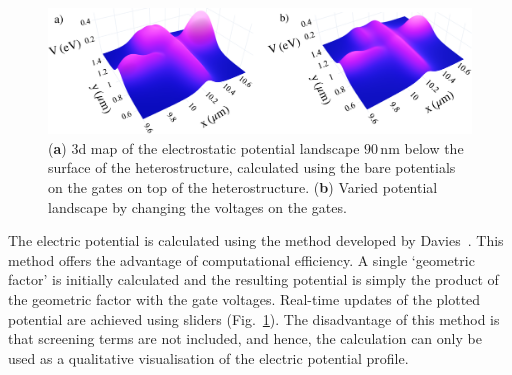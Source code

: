 \begin{figure}[!bht]
 \begin{center}
 \includegraphics[width=1.0\textwidth]{figures/appendix/appendix2_potential.pdf}
 \caption[Electric Potential Calculation]{\label{fig:appx/kwant_pot} 
 (\textbf{a}) 3d map of the electrostatic potential landscape $90\,\mathrm{nm}$ below the surface of the heterostructure, calculated using the bare potentials on the gates on top of the heterostructure. (\textbf{b}) Varied potential landscape by changing the voltages on the gates.}
 \end{center}
\end{figure}



The electric potential is calculated using the method developed by Davies~\cite{Davies1995}. This method offers the advantage of computational efficiency. A single `geometric factor' is initially calculated and the resulting potential is simply the product of the geometric factor with the gate voltages. Real-time updates of the plotted potential are achieved using sliders (Fig.~\ref{fig:appx/kwant_pot}). The disadvantage of this method is that screening terms are not included, and hence, the calculation can only be used as a qualitative visualisation of the electric potential profile.




